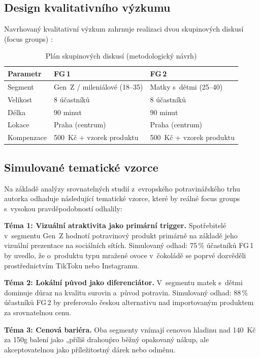 \subsection{Design kvalitativního výzkumu}

Navrhovaný kvalitativní výzkum zahrnuje realizaci dvou skupinových diskusí (focus groups) \parencite{krueger_casey_2015, morgan_1997}:

\begin{table}[H]
\centering
\caption{Plán skupinových diskusí (metodologický návrh)}
\label{tab:focus_groups_plan}
\begin{tabularx}{\textwidth}{lXX}
\toprule
\textbf{Parametr} & \textbf{FG\,1} & \textbf{FG\,2} \\
\midrule
Segment & Gen~Z / mileniálové (18--35) & Matky s~dětmi (25--40) \\
Velikost & 8 účastníků & 8 účastníků \\
Délka & 90 minut & 90 minut \\
Lokace & Praha (centrum) & Praha (centrum) \\
Kompenzace & 500~Kč + vzorek produktu & 500~Kč + vzorek produktu \\
\bottomrule
\end{tabularx}
\end{table}

\subsection{Simulované tematické vzorce}

Na základě analýzy srovnatelných studií z~evropského potravinářského trhu autorka odhaduje následující tematické vzorce, které by reálné focus groups s~vysokou pravděpodobností odhalily:

\textbf{Téma 1: Vizuální atraktivita jako primární trigger.} Spotřebitelé v~segmentu Gen~Z hodnotí potravinový produkt primárně na základě jeho vizuální prezentace na sociálních sítích. Simulovaný odhad: 75\,\% účastníků FG\,1 by uvedlo, že o~produktu typu mražené ovoce v~čokoládě se poprvé dozvěděli prostřednictvím TikToku nebo Instagramu.

\textbf{Téma 2: Lokální původ jako diferenciátor.} V~segmentu matek s~dětmi dominuje důraz na kvalitu surovin a~původ potravin. Simulovaný odhad: 88\,\% účastníků FG\,2 by preferovalo českou alternativu nad importovaným produktem za srovnatelnou cenu.

\textbf{Téma 3: Cenová bariéra.} Oba segmenty vnímají cenovou hladinu nad 140~Kč za 150g balení jako „příliš drahou\" pro běžný opakovaný nákup, ale akceptovatelnou jako příležitostný dárek nebo odměnu.

